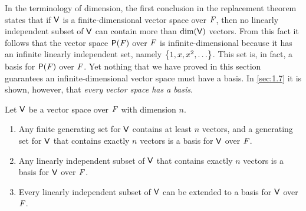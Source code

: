 \begin{note}
	In the terminology of dimension, the first conclusion in the replacement theorem states that if \(\mathsf{V}\) is a finite-dimensional vector space over \(\mathit{F}\), then no linearly independent subset of \(\mathsf{V}\) can contain more than \(\dim(\mathsf{V})\) vectors.
	From this fact it follows that the vector space \(\ps{\F}\) over \(\mathit{F}\) is infinite-dimensional because it has an infinite linearly independent set, namely \(\set{1, x, x^2, \dots}\).
	This set is, in fact, a basis for \(\ps{\F}\) over \(\mathit{F}\).
	Yet nothing that we have proved in this section guarantees an infinite-dimensional vector space must have a basis.
	In \cref{sec:1.7} it is shown, however, that \emph{every vector space has a basis}.
\end{note}

\begin{cor}\label{1.6.15}
	Let \(\mathsf{V}\) be a vector space over \(\mathit{F}\) with dimension \(n\).
	\begin{enumerate}
		\item Any finite generating set for \(\mathsf{V}\) contains at least \(n\) vectors, and a generating set for \(\mathsf{V}\) that contains exactly \(n\) vectors is a basis for \(\mathsf{V}\) over \(\mathit{F}\).
		\item Any linearly independent subset of \(\mathsf{V}\) that contains exactly \(n\) vectors is a basis for \(\mathsf{V}\) over \(\mathit{F}\).
		\item Every linearly independent subset of \(\mathsf{V}\) can be extended to a basis for \(\mathsf{V}\) over \(\mathit{F}\).
	\end{enumerate}
\end{cor}

